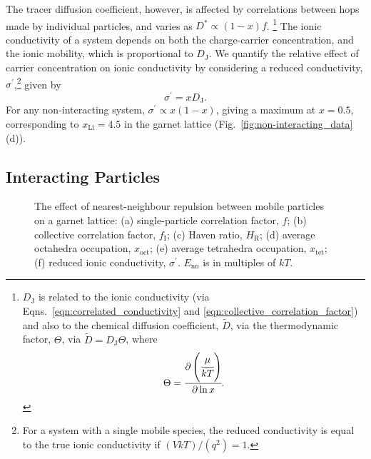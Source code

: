 \documentclass[aps,prb,twocolumn,superscriptaddress,reprint]{revtex4-1}
\newcommand{\xLi}{x_\m{Li}}
\newcommand{\m}[1]{\mathrm{#1}}
\begin{document}
The tracer diffusion coefficient, however, is affected by correlations between hops made by individual particles, and varies as $D^*\propto(1-x)f$. 
\footnote{$D_\m{J}$ is related to the ionic conductivity (via Eqns.~\ref{eqn:correlated_conductivity} and \ref{eqn:collective_correlation_factor}) and also to the chemical diffusion coefficient, ${\widetilde{D}}$, via the thermodynamic factor, $\Theta$, via ${\widetilde{D}}=D_\m{J}\Theta$, where
\begin{equation}
  \Theta = \cfrac{\partial\left(\cfrac{\mu}{kT}\right)}{\partial \ln x}.
\end{equation}}
The ionic conductivity of a system depends on both the charge-carrier concentration, and the ionic mobility, which is proportional to $D_\m{J}$. We quantify the relative effect of carrier concentration on ionic conductivity by
considering a reduced conductivity, $\sigma^\prime$,\footnote{For a system with a single mobile species, the reduced conductivity is equal to the true ionic conductivity if $(VkT)/(q^2)=1$.} given by
\begin{equation}
  \label{eqn:reduced_sigma}
  \sigma^\prime = xD_\m{J}.
\end{equation}
For any non-interacting system, $\sigma^\prime\propto x\left(1-x\right)$, giving a maximum at $x=0.5$, corresponding to $\xLi=4.5$ in the garnet lattice (Fig.~\ref{fig:non-interacting_data}(d)).

\subsection{Interacting Particles}

\begin{figure}[tb]
  \centering
    \caption{\label{fig:nearest_neighbour_data}The effect of nearest-neighbour repulsion between mobile particles on a garnet lattice: (a) single-particle correlation factor, $f$; (b) collective correlation factor, $f_\m{I}$; (c) Haven ratio, $H_\m{R}$; (d) average octahedra occupation, $x_\m{oct}$; (e) average tetrahedra occupation, $x_\m{tet}$; (f) reduced ionic conductivity, $\sigma^\prime$. $E_\m{nn}$ is in multiples of $kT$.}
\end{figure}
\end{document}
